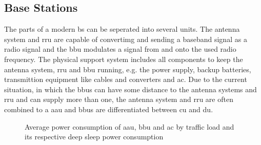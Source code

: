 \documentclass[11pt,a4paper]{article}
\begin{document}
\subsection{Base Stations}\label{subsec:BSConsumption}

The parts of a modern \acrshort{bs} can be seperated into several units.
The antenna system and \acrfull{rru} are capable of convertimg and sending a baseband signal as a radio signal and the \acrfull{bbu} modulates a signal from and onto the used radio frequency.
The physical support system includes all components to keep the antenna system, \acrshort{rru} and \acrshort{bbu} running, e.g. the power supply, backup batteries, transmittion equipment like cables and converters and \acrfull{ac}.
Due to the current situation, in which the \acrshort{bbu}s can have some distance to the antenna systems and \acrshort{rru} and can supply more than one, the antenna system and \acrshort{rru} are often combined to a \acrfull{aau} and \acrshort{bbu}s are differentiated between \acrfull{cu} and \acrfull{du}.

\begin{figure}[h]
  \centering
  \caption{Average power consumption of  \acrshort{aau}, \acrshort{bbu} and \acrshort{ac} by traffic load and its respective deep sleep power consumption \citep{green5G}}
  \label{fig:BSConsumption}
\end{figure}
\end{document}
